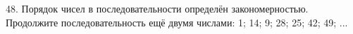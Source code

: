 48. Порядок чисел в последовательности определён закономерностью. Продолжите последовательность ещё двумя числами: 1; 14; 9; 28; 25; 42; 49; ...\\
